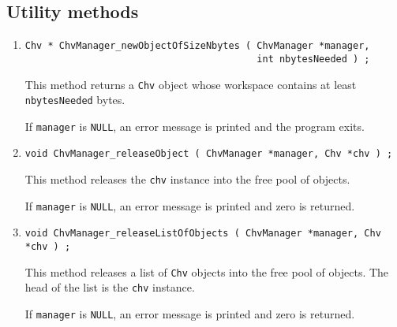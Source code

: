 \subsection{Utility methods}
\label{subsection:ChvManager:proto:utility}
\par
\begin{enumerate}
\item
\begin{verbatim}
Chv * ChvManager_newObjectOfSizeNbytes ( ChvManager *manager, 
                                         int nbytesNeeded ) ; 
\end{verbatim}
\par
This method returns a {\tt Chv} object whose workspace contains at
least {\tt nbytesNeeded} bytes.
\par {}
If {\tt manager} is {\tt NULL},
an error message is printed and the program exits.
\item
\begin{verbatim}
void ChvManager_releaseObject ( ChvManager *manager, Chv *chv ) ;
\end{verbatim}
\par
This method releases the {\tt chv} instance into the free pool of
objects.
\par {}
If {\tt manager} is {\tt NULL},
an error message is printed and zero is returned.
\item
\begin{verbatim}
void ChvManager_releaseListOfObjects ( ChvManager *manager, Chv *chv ) ;
\end{verbatim}
\par
This method releases a list of {\tt Chv} objects into the free pool of
objects.
The head of the list is the {\tt chv} instance.
\par {}
If {\tt manager} is {\tt NULL},
an error message is printed and zero is returned.
\end{enumerate}
\par
